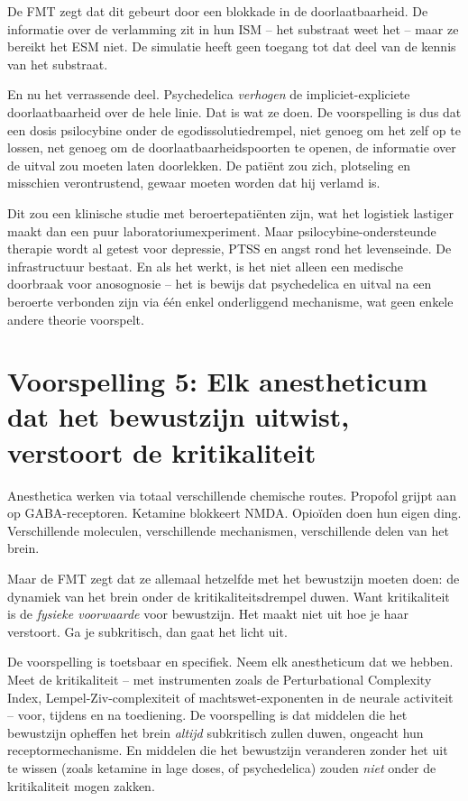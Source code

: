 \documentclass[11pt, twoside, openright]{book}
\begin{document}
De FMT zegt dat dit gebeurt door een blokkade in de doorlaatbaarheid. De informatie over de verlamming zit in hun ISM -- het substraat weet het -- maar ze bereikt het ESM niet. De simulatie heeft geen toegang tot dat deel van de kennis van het substraat.

En nu het verrassende deel. Psychedelica \textit{verhogen} de impliciet-expliciete doorlaatbaarheid over de hele linie. Dat is wat ze doen. De voorspelling is dus dat een dosis psilocybine onder de egodissolutiedrempel, niet genoeg om het zelf op te lossen, net genoeg om de doorlaatbaarheidspoorten te openen, de informatie over de uitval zou moeten laten doorlekken. De patiënt zou zich, plotseling en misschien verontrustend, gewaar moeten worden dat hij verlamd is.

Dit zou een klinische studie met beroertepatiënten zijn, wat het logistiek lastiger maakt dan een puur laboratoriumexperiment. Maar psilocybine-ondersteunde therapie wordt al getest voor depressie, PTSS en angst rond het levenseinde. De infrastructuur bestaat. En als het werkt, is het niet alleen een medische doorbraak voor anosognosie -- het is bewijs dat psychedelica en uitval na een beroerte verbonden zijn via één enkel onderliggend mechanisme, wat geen enkele andere theorie voorspelt.

\section*{Voorspelling 5: Elk anestheticum dat het bewustzijn uitwist, verstoort de kritikaliteit}

Anesthetica werken via totaal verschillende chemische routes. Propofol grijpt aan op GABA-receptoren. Ketamine blokkeert NMDA. Opioïden doen hun eigen ding. Verschillende moleculen, verschillende mechanismen, verschillende delen van het brein.

Maar de FMT zegt dat ze allemaal hetzelfde met het bewustzijn moeten doen: de dynamiek van het brein onder de kritikaliteitsdrempel duwen. Want kritikaliteit is de \textit{fysieke voorwaarde} voor bewustzijn. Het maakt niet uit hoe je haar verstoort. Ga je subkritisch, dan gaat het licht uit.

De voorspelling is toetsbaar en specifiek. Neem elk anestheticum dat we hebben. Meet de kritikaliteit -- met instrumenten zoals de Perturbational Complexity Index, Lempel-Ziv-complexiteit of machtswet-exponenten in de neurale activiteit -- voor, tijdens en na toediening. De voorspelling is dat middelen die het bewustzijn opheffen het brein \textit{altijd} subkritisch zullen duwen, ongeacht hun receptormechanisme. En middelen die het bewustzijn veranderen zonder het uit te wissen (zoals ketamine in lage doses, of psychedelica) zouden \textit{niet} onder de kritikaliteit mogen zakken.
\end{document}
